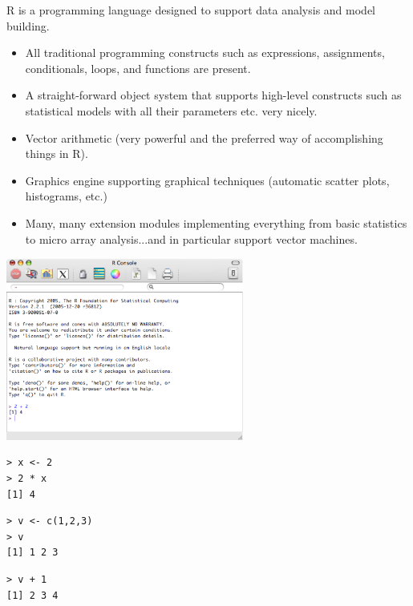 \documentclass[a4paper,blends,pdf,colorBG,slideColor]{prosper}
\begin{document}
R is a programming language designed to support data analysis and model building.

\begin{itemize}
\item All traditional programming constructs such as expressions, assignments, conditionals, loops, and functions are present.
\item A straight-forward object system that supports high-level constructs such as statistical models with all their parameters etc. very nicely.
\item Vector arithmetic (very powerful and the preferred way of accomplishing things in R).
\item Graphics engine supporting graphical techniques (automatic scatter plots, histograms, etc.)
\item Many, many extension modules implementing everything from basic statistics to micro array analysis...and in particular support vector machines.
\end{itemize}
\es

\begin{center}
   \includegraphics[height=60mm]{figures/r-screen.eps}
\end{center}
\es

\begin{minipage}[t]{1in}
\begin{verbatim}
> x <- 2
> 2 * x
[1] 4
\end{verbatim}
\end{minipage}
\begin{minipage}[t]{1.5in}
\begin{verbatim}
> v <- c(1,2,3)
> v
[1] 1 2 3
\end{verbatim}
\end{minipage}
\begin{minipage}[t]{1in}
\begin{verbatim}
> v + 1
[1] 2 3 4
\end{verbatim}
\end{minipage}
\end{document}
